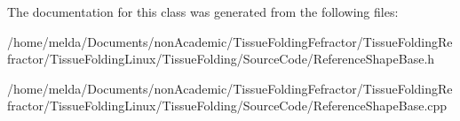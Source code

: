 The documentation for this class was generated from the following files\+:\begin{DoxyCompactItemize}
\item 
/home/melda/\+Documents/non\+Academic/\+Tissue\+Folding\+Fefractor/\+Tissue\+Folding\+Refractor/\+Tissue\+Folding\+Linux/\+Tissue\+Folding/\+Source\+Code/Reference\+Shape\+Base.\+h\item 
/home/melda/\+Documents/non\+Academic/\+Tissue\+Folding\+Fefractor/\+Tissue\+Folding\+Refractor/\+Tissue\+Folding\+Linux/\+Tissue\+Folding/\+Source\+Code/Reference\+Shape\+Base.\+cpp\end{DoxyCompactItemize}
